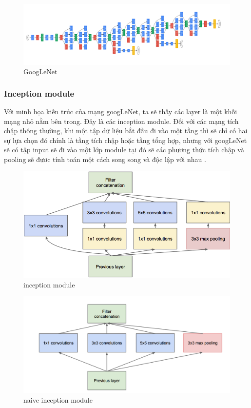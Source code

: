 		
	\begin{figure}[h!]
			\centering
			\includegraphics[scale=0.7]{charts/googlenet.png}
			\caption{GoogLeNet \cite{1}}
			\label{fig:googlenet}
		\end{figure}
		
	
	\subsubsection{Inception module}
	Với minh họa kiến trúc của mạng googLeNet, ta sẽ thấy các layer là một khối mạng nhỏ nằm bên trong. Đây là các inception module. Đối với các mạng tích chập thông thường, khi một tập dữ liệu bắt đầu đi vào một tầng thì sẽ chỉ có hai sự lựa chọn đó chính là tầng tích chập hoặc tầng tổng hợp, nhưng với googLeNet sẽ có tập input sẽ đi vào một lớp module tại đó sẽ các phương thức tích chập và pooling sẽ đươc tính toán một cách song song và độc lập với nhau \cite{1}.
	
	\begin{figure}[h!]
			\centering
			\includegraphics[scale=1.5]{charts/inception.png}
			\caption{inception module \cite{1}}
			\label{fig:inception}
	\end{figure}

	\begin{figure}[h!]
			\centering
			\includegraphics[scale=0.3]{charts/inception_nai.png}
			\caption{naive inception module \cite{1}}
			\label{fig:nai_inception}
	\end{figure}
		

